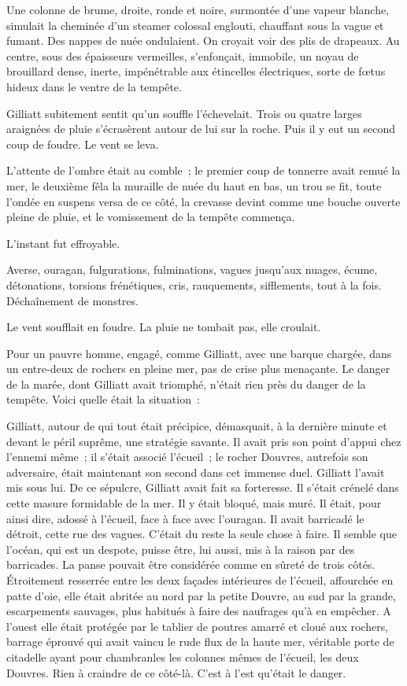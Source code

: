 \documentclass[french,twoside]{book} %
\begin{document}
Une colonne de brume, droite, ronde et noire, surmontée d’une vapeur blanche, simulait la cheminée d’un steamer colossal englouti, chauffant sous la vague et fumant. Des nappes de nuée ondulaient. On croyait voir des plis de drapeaux. Au centre, sous des épaisseurs vermeilles, s’enfonçait, immobile, un noyau de brouillard dense, inerte, impénétrable aux étincelles électriques, sorte de fœtus hideux dans le ventre de la tempête.\par
Gilliatt subitement sentit qu’un souffle l’échevelait. Trois ou quatre larges araignées de pluie s’écrasèrent  autour de lui sur la roche. Puis il y eut un second coup de foudre. Le vent se leva.\par
L’attente de l’ombre était au comble ; le premier coup de tonnerre avait remué la mer, le deuxième fêla la muraille de nuée du haut en bas, un trou se fit, toute l’ondée en suspens versa de ce côté, la crevasse devint comme une bouche ouverte pleine de pluie, et le vomissement de la tempête commença.\par
L’instant fut effroyable.\par
Averse, ouragan, fulgurations, fulminations, vagues jusqu’aux nuages, écume, détonations, torsions frénétiques, cris, rauquements, sifflements, tout à la fois. Déchaînement de monstres.\par
Le vent soufflait en foudre. La pluie ne tombait pas, elle croulait.\par
Pour un pauvre homme, engagé, comme Gilliatt, avec une barque chargée, dans un entre-deux de rochers en pleine mer, pas de crise plus menaçante. Le danger de la marée, dont Gilliatt avait triomphé, n’était rien près du danger de la tempête. Voici quelle était la situation :\par
Gilliatt, autour de qui tout était précipice, démasquait, à la dernière minute et devant le péril suprême, une stratégie savante. Il avait pris son point d’appui chez l’ennemi même ; il s’était associé l’écueil ; le rocher Douvres, autrefois son adversaire, était maintenant son second dans cet immense duel. Gilliatt l’avait mis sous lui. De ce sépulcre, Gilliatt avait fait sa forteresse. Il s’était crénelé dans cette masure formidable de la mer. Il y était bloqué, mais muré. Il  était, pour ainsi dire, adossé à l’écueil, face à face avec l’ouragan. Il avait barricadé le détroit, cette rue des vagues. C’était du reste la seule chose à faire. Il semble que l’océan, qui est un despote, puisse être, lui aussi, mis à la raison par des barricades. La panse pouvait être considérée comme en sûreté de trois côtés. Étroitement resserrée entre les deux façades intérieures de l’écueil, affourchée en patte d’oie, elle était abritée au nord par la petite Douvre, au sud par la grande, escarpements sauvages, plus habitués à faire des naufrages qu’à en empêcher. A l’ouest elle était protégée par le tablier de poutres amarré et cloué aux rochers, barrage éprouvé qui avait vaincu le rude flux de la haute mer, véritable porte de citadelle ayant pour chambranles les colonnes mêmes de l’écueil, les deux Douvres. Rien à craindre de ce côté-là. C’est à l’est qu’était le danger.\par
\end{document}
